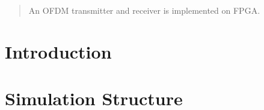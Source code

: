 \begin{abstract}
An OFDM transmitter and receiver is implemented on FPGA.\\
\end{abstract}

\section{Introduction}


\section{Simulation Structure}
\label{sec_simstruct}
